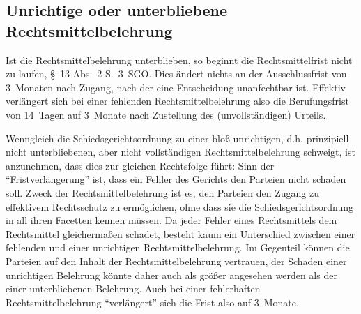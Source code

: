 \subsection{Unrichtige oder unterbliebene Rechtsmittelbelehrung}
Ist die Rechtsmittelbelehrung unterblieben, so beginnt die Rechtsmittelfrist nicht zu laufen, \S~13 Abs.~2 S.~3~SGO. Dies ändert nichts an der Ausschlussfrist von 3~Monaten nach Zugang, nach der eine Entscheidung unanfechtbar ist. Effektiv verlängert sich bei einer fehlenden Rechtsmittelbelehrung also die Berufungsfrist von 14~Tagen auf 3~Monate nach Zustellung des (unvollständigen) Urteils.

Wenngleich die Schiedsgerichtsordnung zu einer bloß unrichtigen, d.h. prinzipiell nicht unterbliebenen, aber nicht vollständigen Rechtsmittelbelehrung schweigt, ist anzunehmen, dass dies zur gleichen Rechtsfolge führt: Sinn der \enquote{Fristverlängerung} ist, dass ein Fehler des Gerichts den Parteien nicht schaden soll. Zweck der Rechtsmittelbelehrung ist es, den Parteien den Zugang zu effektivem Rechtsschutz zu ermöglichen, ohne dass sie die Schiedsgerichtsordnung in all ihren Facetten kennen müssen. Da jeder Fehler eines Rechtsmittels dem Rechtsmittel gleichermaßen schadet, besteht kaum ein Unterschied zwischen einer fehlenden und einer unrichtigen Rechtsmittelbelehrung. Im Gegenteil können die Parteien auf den Inhalt der Rechtsmittelbelehrung vertrauen, der Schaden einer unrichtigen Belehrung könnte daher auch als größer angesehen werden als der einer unterbliebenen Belehrung. Auch bei einer fehlerhaften Rechtsmittelbelehrung \enquote{verlängert} sich die Frist also auf 3~Monate.

